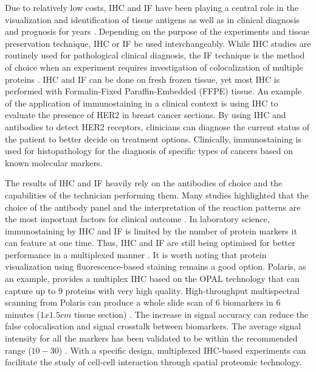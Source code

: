 Due to relatively low costs, IHC and IF have been playing a central role in the visualization and identification of tissue antigens as well as in clinical diagnosis and prognosis for years \cite{ducheyne2015comprehensive, rupprecht2015current}. Depending on the purpose of the experiments and tissue preservation technique, IHC or IF be used interchangeably. While IHC studies are routinely used for pathological clinical diagnosis, the IF technique is the method of choice when an experiment requires investigation of colocalization of multiple proteins \cite{joshi2017immunofluorescence}. IHC and IF can be done on fresh frozen tissue, yet most IHC is performed with Formalin-Fixed Paraffin-Embedded (FFPE) tissue. An example of the application of immunostaining in a clinical context is using IHC to evaluate the presence of HER2 in breast cancer sections. By using IHC and antibodies to detect HER2 receptors, clinicians can diagnose the current status of the patient to better decide on treatment options. Clinically, immunostaining is used for histopathology for the diagnosis of specific types of cancers based on known molecular markers.  

The results of IHC and IF heavily rely on the antibodies of choice and the capabilities of the technician performing them. Many studies highlighted that the choice of the antibody panel and the interpretation of the reaction patterns are the most important factors for clinical outcome \cite{de2010immunohistochemistry, jensen1997immunohistochemistry}. In laboratory science, immunostaining by IHC and IF is limited by the number of protein markers it can feature at one time. Thus, IHC and IF are still being optimised for better performance in a multiplexed manner \cite{joshi2017immunofluorescence}. It is worth noting that protein visualization using fluorescence-based staining remains a good option. Polaris, as an example, provides a multiplex IHC based on the OPAL technology that can capture up to 9 proteins with very high quality. High-throughput multispectral scanning from Polaris can produce a whole slide scan of 6 biomarkers in 6 minutes ($1x1.5cm$ tissue section) \cite{hoyt2021multiplex, baharlou2019mass,marc201934th}. The increase in signal accuracy can reduce the false colocalisation and signal crosstalk between biomarkers. The average signal intensity for all the markers has been validated to be within the recommended range ($10-30$) \cite{donovan2021924}. With a specific design, multiplexed IHC-based experiments can facilitate the study of cell-cell interaction through spatial proteomic technology.  

